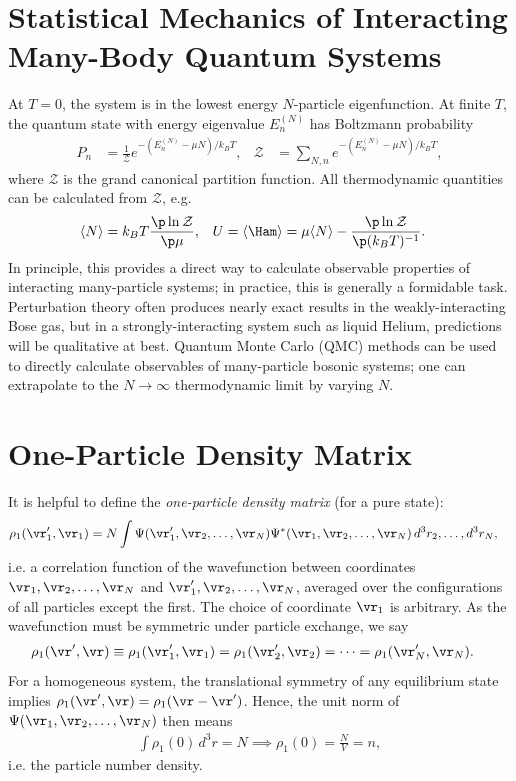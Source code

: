 \documentclass[qo.tex]{subfiles}
\begin{document}
\section{Statistical Mechanics of Interacting Many-Body Quantum Systems}
At $T=0$, the system is in the lowest energy $N$-particle eigenfunction.
At finite $T$, the quantum state with energy eigenvalue $E_n^{(N)}$ has Boltzmann probability
\begin{align}
    P_n &= \frac{1}{\mathcal{Z}}e^{-(E_n^{(N)}-\mu N)/k_BT}, & \mathcal{Z} &= \sum_{N,n}e^{-(E_n^{(N)}-\mu N)/k_BT},
\end{align}
where $\mathcal{Z}$ is the grand canonical partition function.
All thermodynamic quantities can be calculated from $\mathcal{Z}$, e.g. 
\begin{align}
    \langle N\rangle &= k_BT\frac{\p\ln\mathcal{Z}}{\p\mu}, & U &= \langle\Ham\rangle = \mu\langle N\rangle - \frac{\p\ln\mathcal{Z}}{\p(k_BT)^{-1}}.
\end{align}
In principle, this provides a direct way to calculate observable properties of interacting many-particle systems; in practice, this is generally a formidable task. 
Perturbation theory often produces nearly exact results in the weakly-interacting Bose gas, but in a strongly-interacting system such as liquid Helium, predictions will be qualitative at best. 
Quantum Monte Carlo (QMC) methods can be used to directly calculate observables of many-particle bosonic systems; one can extrapolate to the $N\to\infty$ thermodynamic limit by varying $N$.

\section{One-Particle Density Matrix}
It is helpful to define the \emph{one-particle density matrix} (for a pure state):
\begin{align}
    \rho_1(\vr_1',\vr_1) &= N\int \Psi(\vr_1',\vr_2,\dots,\vr_N)\Psi^*(\vr_1,\vr_2,\dots,\vr_N)\,d^3r_2,\dots,d^3r_N,
\end{align}
i.e. a correlation function of the wavefunction between coordinates $\vr_1,\vr_2,\dots,\vr_N$ and $\vr_1',\vr_2,\dots,\vr_N$, averaged over the configurations of all particles except the first.
The choice of coordinate $\vr_1$ is arbitrary. 
As the wavefunction must be symmetric under particle exchange, we say
\begin{align}
    \rho_1(\vr',\vr) &\equiv \rho_1(\vr_1',\vr_1) = \rho_1(\vr_2',\vr_2) = \cdots = \rho_1(\vr_N',\vr_N).
\end{align}
For a homogeneous system, the translational symmetry of any equilibrium state implies $\rho_1(\vr',\vr)=\rho_1(\vr-\vr')$.
Hence, the unit norm of $\Psi(\vr_1,\vr_2,\dots,\vr_N)$ then means
\begin{align}
    \int \rho_1(0)\,d^3r = N \implies \rho_1(0) = \frac{N}{V} = n,
\end{align}
i.e. the particle number density.
\end{document}
